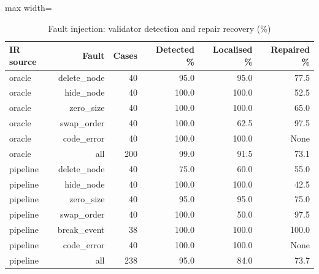 \begin{table}[t]
\centering
\scriptsize
\caption{Fault injection: validator detection and repair recovery (\%)}
\label{tab:faults}
\setlength{\tabcolsep}{3.5pt}
\begin{adjustbox}{max width=\columnwidth}
\begin{tabular}{lrrrrr}
\toprule
\textbf{IR source} & \textbf{Fault} & \textbf{Cases} & \textbf{Detected \%} & \textbf{Localised \%} & \textbf{Repaired \%} \\
\midrule
oracle & delete\_node & 40 & 95.0 & 95.0 & 77.5 \\
oracle & hide\_node & 40 & 100.0 & 100.0 & 52.5 \\
oracle & zero\_size & 40 & 100.0 & 100.0 & 65.0 \\
oracle & swap\_order & 40 & 100.0 & 62.5 & 97.5 \\
oracle & code\_error & 40 & 100.0 & 100.0 & None \\
oracle & all & 200 & 99.0 & 91.5 & 73.1 \\
pipeline & delete\_node & 40 & 75.0 & 60.0 & 55.0 \\
pipeline & hide\_node & 40 & 100.0 & 100.0 & 42.5 \\
pipeline & zero\_size & 40 & 95.0 & 95.0 & 75.0 \\
pipeline & swap\_order & 40 & 100.0 & 50.0 & 97.5 \\
pipeline & break\_event & 38 & 100.0 & 100.0 & 100.0 \\
pipeline & code\_error & 40 & 100.0 & 100.0 & None \\
pipeline & all & 238 & 95.0 & 84.0 & 73.7 \\
\bottomrule
\end{tabular}
\end{adjustbox}
\end{table}
